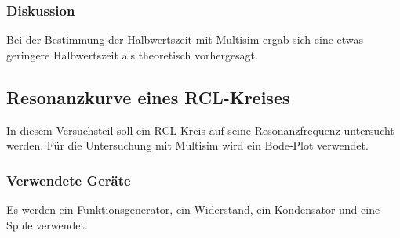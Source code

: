 \documentclass[12pt,a4paper]{article}
\begin{document}
\subsubsection{Diskussion}

Bei der Bestimmung der Halbwertszeit mit Multisim ergab sich eine etwas geringere Halbwertszeit als theoretisch vorhergesagt.

\subsection{Resonanzkurve eines RCL-Kreises}

In diesem Versuchsteil soll ein RCL-Kreis auf seine Resonanzfrequenz untersucht werden. Für die Untersuchung mit Multisim wird ein Bode-Plot verwendet.

\subsubsection{Verwendete Geräte}

Es werden ein Funktionsgenerator, ein Widerstand, ein Kondensator und eine Spule verwendet.
\end{document}
